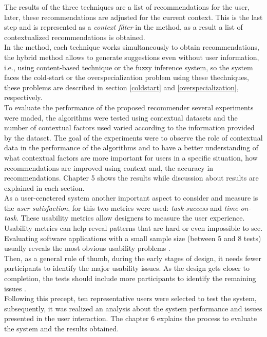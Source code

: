 The results of the three techniques are a list of recommendations for
the user, later, these recommendations are adjusted for the current context.
This is the last step and is represented as a \textit{context filter} in the
method, as a result a list of contextualized
recommendations is obtained. \\
In the method, each technique works simultaneously to obtain
recommendations, the hybrid method allows to generate suggestions even
without user information, i.e., using content-based technique or the
fuzzy inference system, so the system faces the cold-start or the
overspecialization problem using these thechniques, these problems are
described in section \ref{coldstart} and 
 \ref{overspecialization}, respectively.\\
To evaluate the performance of the proposed recommender several experiments
were maded, the algorithms were tested using contextual datasets and
the number of contextual factors used varied according to the information
provided by the dataset. The goal of the experiments were to observe
the role of contextual data  in the performance of the algorithms and to 
have a better understanding of what contextual
factors are more important for users in a specific situation, how recommendations
are improved using context and, the accuracy in recommendations.
Chapter 5 shows the results while discussion about results are
explained in each section.\\
As a user-cenetered system another important aspect 
to consider and measure is the \textit{user satisfaction}, for this two
metrics were used: \textit{task-success} and \textit
{time-on-task}. These usability metrics allow designers to measure 
the user experience.
\\ Usability
metrics can help reveal patterns that are hard or even impossible to
see. Evaluating software applications with a small sample size 
(between 5 and 8 tests) usually reveals the most obvious 
usability problems \cite{albert2013measuring}.\\ 
Then, as
a general rule of thumb, during the early stages of design, it needs
fewer participants to identify the major usability issues. As the
design gets closer to completion, the tests should include more
participants to identify the remaining
issues \cite{albert2013measuring}.\\ 
Following this precept, ten representative users were selected to test
the system, subsequently, it was realized an analysis about the system
performance and issues presented in the user interaction. The chapter
6 explains the process to evaluate the system and the
results obtained.

